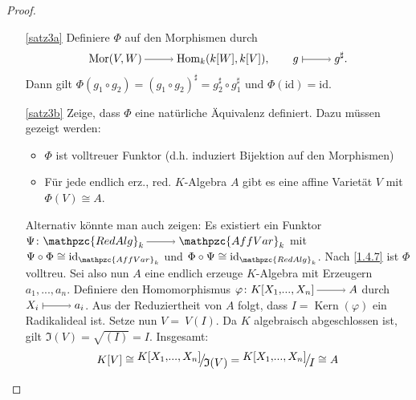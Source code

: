\documentclass[a4paper,12pt]{scrbook}
\theoremstyle{keinenummern} %
\theoremstyle{mitnummern}
\theoremstyle{unserbeweis}
\newtheorem{proof}{Beweis}
\def\I{\mathfrak{I}}
\newcommand{\AffVar}{\mathpzc{AffVar}}
\newcommand{\RedAlg}{\mathpzc{RedAlg}}
\newcommand{\Hom}{\mathrm{Hom}}
\newcommand{\Mor}{\mathrm{Mor}}
\newcommand{\Kern}{\operatorname{Kern}}
\newcommand{\id}{\mathrm{id}}
\renewcommand{\phi}{\varphi}
\renewcommand{\dotsc}{\ensuremath{\!...}}
\newcommand{\ra}{\raisebox{-1pt}{\tikz{\draw[thin,shorten >=3pt, ->] (0,0) node{\hspace*{-2pt}} -- node{} (1,0);}}\penalty1000\relax}
\renewcommand{\mapsto}{\raisebox{-1pt}{\tikz{\draw[thin,shorten >=3pt, |->] (0,0) node{\hspace*{0pt}} -- node{} (1,0);}}\penalty1000\relax}
\newcommand{\Quotient}[2]{
  \mathchoice
  { %
    \raisebox{0.7ex}{\ensuremath{#1}}
    \ensuremath{\mkern-3mu}\big/\ensuremath{\mkern-3mu}
    \raisebox{-0.6ex}{\ensuremath{#2}}
  }
  { %
    #1/#2
  }
  { %
    #1/#2
  }
  { %
    #1/#2
  }
}
\newcommand{\polyx}[1][n]{\ensuremath%
  [X_{1},\dotsc,X_{#1}]}
\begin{document}
\begin{proof}
\begin{enumerate}
\item[\ref{satz3a}] Definiere $\Phi$ auf den Morphismen durch 
\[\Mor(V,W)\ra \Hom_k(k[W],k[V]), \qquad g\mapsto g^{\sharp}.\]
Dann gilt $\Phi(g_1\circ g_2)=(g_1\circ g_2)^{\sharp}=g_2^\sharp\circ g_1^\sharp$ und $\Phi(\id)=\id$.
\item[\ref{satz3b}] Zeige, dass $\Phi$ eine natürliche Äquivalenz definiert. Dazu müssen gezeigt werden: 
\begin{itemize}
\item $\Phi$ ist volltreuer Funktor (d.h. induziert Bijektion auf den Morphismen)
\item Für jede endlich erz., red. $K$-Algebra $A$ gibt es eine affine Varietät $V$ mit $\Phi(V)\cong A$. 
\end{itemize}
Alternativ könnte man auch zeigen: Es existiert ein Funktor $\Psi\colon  \RedAlg_k\ra \AffVar_k$ mit $\Psi\circ \Phi\cong \id_{\AffVar_k}$ und $\Phi\circ \Psi\cong \id_{\RedAlg_k}$.
Nach \cref{1.4.7} ist $\Phi$ volltreu. Sei also nun $A$ eine endlich erzeuge $K$-Algebra mit Erzeugern $a_1,\dotsc,a_n$.
Definiere den Homomorphismus $\phi\colon  K\polyx\ra A$ durch $X_i\mapsto a_i$. Aus der Reduziertheit von $A$ folgt, dass
$I=\Kern(\phi)$ ein Radikalideal ist. Setze nun $V=\ V(I)$. Da $K$ algebraisch abgeschlossen ist, gilt $\I(V)=\sqrt{(I)}=I$. Insgesamt:
\[K[V]\cong\Quotient{K\polyx}{\I(V)}=\Quotient{K\polyx}{I}\cong A\] 
\end{enumerate}
\end{proof}
\end{document}
